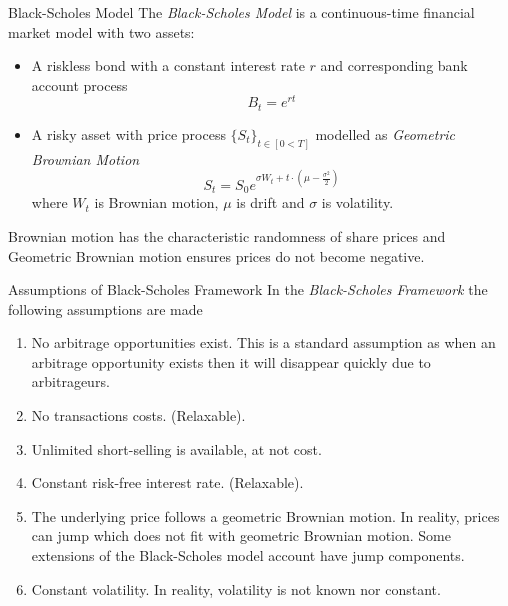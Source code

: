 \documentclass[11pt,a4paper]{article}
\begin{document}
  \begin{definition}{Black-Scholes Model}
    The \textit{Black-Scholes Model} is a continuous-time financial market model with two assets:
    \begin{itemize}
      \item A riskless bond with a constant interest rate $r$ and corresponding bank account process
      \[ B_t=e^{rt} \]
      \item A risky asset with price process $\{S_t\}_{t\in[0<T]}$ modelled as \textit{Geometric Brownian Motion}
      \[ S_t=S_0e^{\sigma W_t+t\cdot\left(\mu-\frac{\sigma^2}2\right)} \]
      where $W_t$ is Brownian motion, $\mu$ is drift and $\sigma$ is volatility.
    \end{itemize}
    Brownian motion has the characteristic randomness of share prices and Geometric Brownian motion ensures prices do not become negative.
  \end{definition}

  \begin{remark}{Assumptions of Black-Scholes Framework}
    In the \textit{Black-Scholes Framework} the following assumptions are made
    \begin{enumerate}
      \item No arbitrage opportunities exist. This is a standard assumption as when an arbitrage opportunity exists then it will disappear quickly due to arbitrageurs.
      \item No transactions costs. (Relaxable).
      \item Unlimited short-selling is available, at not cost.
      \item Constant risk-free interest rate. (Relaxable).
      \item The underlying price follows a geometric Brownian motion. In reality, prices can jump which does not fit with geometric Brownian motion. Some extensions of the Black-Scholes model account have jump components.
      \item Constant volatility. In reality, volatility is not known nor constant.
    \end{enumerate}
  \end{remark}
\end{document}
